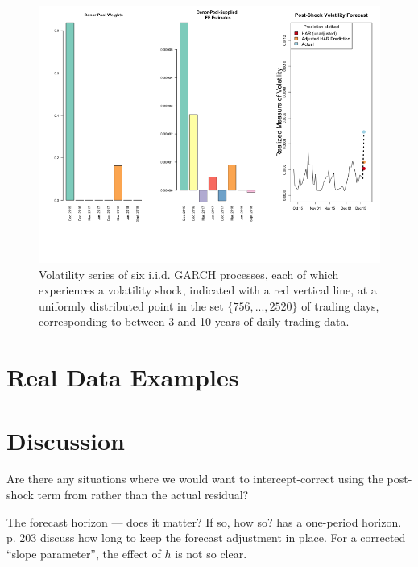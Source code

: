 \documentclass[11pt]{article}
\theoremstyle{definition}
\begin{document}
\begin{figure}[h!]
  \begin{center}
    \includegraphics[scale=.4]{real_data_output_plots/savetime_SatJun151644072024__^VIX-^IRX-^XAU_^VIX_2018-12-18-2015-12-15-2016-12-13-2017-03-14-2017-06-13-2017-12-12-2018-03-20-2018-06-12-2018-09-25.png}
    \caption{Volatility series of six i.i.d. GARCH processes, each of which experiences a volatility shock, indicated with a red vertical line, at a uniformly distributed point in the set $\{756,...,2520\}$ of trading days, corresponding to between 3 and 10 years of daily trading data.}
    \label{fig:six_plots}
    \end{center}
  \end{figure}

\section{Real Data Examples}
\section{Discussion}

Are there any situations where we would want to intercept-correct using the post-shock term from \cite{lin2021minimizing} rather than the actual residual?

The forecast horizon --- does it matter?  If so, how so?  \cite{lin2021minimizing} has a one-period horizon.  \cite{clements1998forecasting}{p. 203} discuss how long to keep the forecast adjustment in place.  For a corrected ``slope parameter'', the effect of $h$ is not so clear.\\
\end{document}
